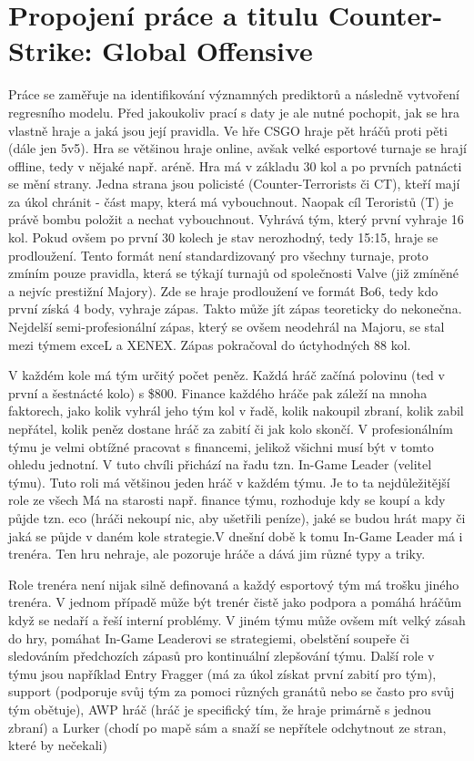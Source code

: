 \newpage
\section{Propojení práce a titulu Counter-Strike: Global Offensive}
{\color{red}
Práce se zaměřuje na identifikování významných prediktorů a následně vytvoření regresního modelu. Před jakoukoliv prací s daty je ale nutné pochopit, jak se hra vlastně hraje a
jaká jsou její pravidla. 
}
Ve hře \ac{CSGO} hraje pět hráčů proti pěti (dále jen 5v5). Hra se většinou hraje online, avšak velké esportové turnaje se hrají offline, tedy v nějaké např. aréně.
Hra má v základu 30 kol a po  prvních patnácti se mění strany. Jedna strana jsou policisté (Counter-Terrorists či CT), kteří mají za úkol chránit  - část mapy,
která má vybouchnout. Naopak cíl Teroristů (T) je právě bombu položit a  nechat vybouchnout. Vyhrává tým, který první vyhraje 16 kol. Pokud ovšem po první 30 kolech
je stav nerozhodný, tedy 15:15, hraje se prodloužení. Tento formát není standardizovaný pro všechny turnaje, proto zmíním pouze pravidla, která se týkají turnajů od společnosti
Valve (již zmíněné a nejvíc prestižní Majory). Zde se hraje prodloužení ve formát Bo6, tedy kdo první získá 4 body, vyhraje zápas. Takto může jít zápas teoreticky
do nekonečna. Nejdelší semi-profesionální zápas, který se ovšem neodehrál na Majoru, se stal mezi týmem exceL a XENEX\cite{hltv.org2015}. Zápas pokračoval do úctyhodných 88 kol.

V každém kole má tým určitý počet peněz. Každá hráč začíná polovinu (ted v první a šestnácté kolo) s \$800. Finance každého hráče pak záleží na mnoha
faktorech, 
{\color{red}
jako
}
kolik vyhrál jeho tým kol v řadě, kolik nakoupil zbraní, kolik zabil nepřátel, kolik peněz dostane hráč za zabití či jak kolo skončí. V profesionálním týmu je
velmi obtížné pracovat s financemi, jelikož všichni musí být v tomto ohledu jednotní. V tuto chvíli přichází na řadu tzn. In-Game Leader (velitel týmu). Tuto roli má většinou
jeden hráč v každém týmu. Je to ta nejdůležitější role ze všech Má na starosti např. finance týmu, rozhoduje kdy se koupí a kdy půjde tzn. eco (hráči nekoupí nic, aby ušetřili peníze),
jaké se budou hrát mapy či jaká se půjde v daném kole strategie.V dnešní době k tomu In-Game Leader má i trenéra. Ten hru nehraje, ale pozoruje hráče a dává jim
různé typy a triky.

Role trenéra není nijak silně definovaná a každý esportový tým má trošku jiného trenéra. V jednom případě může být trenér čistě jako podpora {\color{red}
a
} 
pomáhá hráčům když se nedaří a
řeší interní problémy. V jiném týmu může ovšem mít velký zásah do hry, pomáhat In-Game Leaderovi se strategiemi, obelstění soupeře či sledováním předchozích zápasů pro
kontinuální zlepšování týmu. Další role v týmu jsou například Entry Fragger (má za úkol získat první zabití pro tým), support (podporuje svůj tým za pomoci různých granátů
nebo se často pro svůj tým obětuje), AWP hráč (hráč je specifický tím, že hraje primárně s jednou zbraní) a Lurker (chodí po mapě sám a snaží se
nepřítele odchytnout ze stran, které by nečekali)

